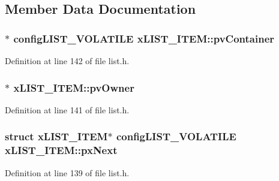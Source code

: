 \subsection{Member Data Documentation}
\subsubsection[{\texorpdfstring{pv\+Container}{pvContainer}}]{$\ast$ {\bf config\+L\+I\+S\+T\+\_\+\+V\+O\+L\+A\+T\+I\+LE} x\+L\+I\+S\+T\+\_\+\+I\+T\+E\+M\+::pv\+Container}\hypertarget{structx_l_i_s_t___i_t_e_m_a341462d06236aa07eaf1a864e4b59951}{}\label{structx_l_i_s_t___i_t_e_m_a341462d06236aa07eaf1a864e4b59951}


Definition at line 142 of file list.\+h.

\subsubsection[{\texorpdfstring{pv\+Owner}{pvOwner}}]{$\ast$ x\+L\+I\+S\+T\+\_\+\+I\+T\+E\+M\+::pv\+Owner}\hypertarget{structx_l_i_s_t___i_t_e_m_aeb3110b50fe0dbce826d929b27b5ddb1}{}\label{structx_l_i_s_t___i_t_e_m_aeb3110b50fe0dbce826d929b27b5ddb1}


Definition at line 141 of file list.\+h.

\subsubsection[{\texorpdfstring{px\+Next}{pxNext}}]{\setlength{\rightskip}{0pt plus 5cm}struct {\bf x\+L\+I\+S\+T\+\_\+\+I\+T\+EM}$\ast$ {\bf config\+L\+I\+S\+T\+\_\+\+V\+O\+L\+A\+T\+I\+LE} x\+L\+I\+S\+T\+\_\+\+I\+T\+E\+M\+::px\+Next}\hypertarget{structx_l_i_s_t___i_t_e_m_a03713c4ee953ef5ca6adbec883720c60}{}\label{structx_l_i_s_t___i_t_e_m_a03713c4ee953ef5ca6adbec883720c60}


Definition at line 139 of file list.\+h.

